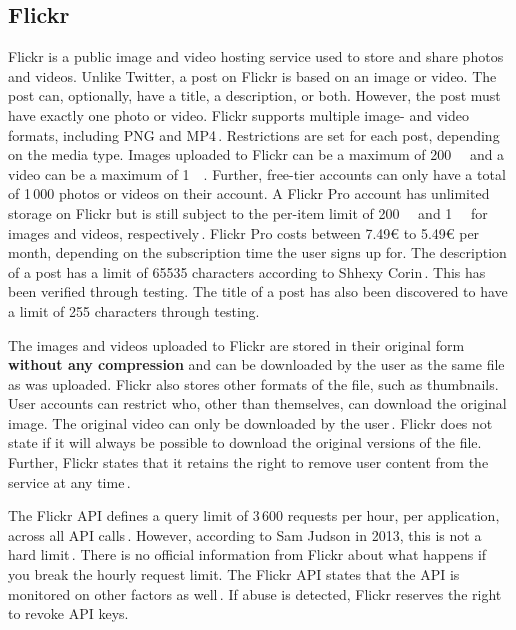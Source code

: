 \subsection{Flickr}
\label{subsec:ows_flickr}
Flickr is a public image and video hosting service used to store and share photos and videos. Unlike Twitter, a post on Flickr is based on an image or video. The post can, optionally, have a title, a description, or both. However, the post must have exactly one photo or video. Flickr supports multiple image- and video formats, including PNG and MP4\,\cite{FlickrUploadRequirements2022}. Restrictions are set for each post, depending on the media type. Images uploaded to Flickr can be a maximum of \SI{200}{\mega\byte} and a video can be a maximum of \SI{1}{\giga\byte}. Further, free-tier accounts can only have a total of 1\,000 photos or videos on their account. A Flickr Pro account has unlimited storage on Flickr but is still subject to the per-item limit of \SI{200}{\mega\byte} and \SI{1}{\giga\byte} for images and videos, respectively\,\cite{flickrinc.UpgradeEverythingYou}. Flickr Pro costs between 7.49€ to 5.49€ per month, depending on the subscription time the user signs up for. The description of a post has a limit of 65535 characters according to Shhexy Corin\,\cite{FlickrHelpForum2009}. This has been verified through testing. The title of a post has also been discovered to have a limit of 255 characters through testing.

The images and videos uploaded to Flickr are stored in their original form \textbf{without any compression} and can be downloaded by the user as the same file as was uploaded\cite{flickrinc.DownloadPermissions}. Flickr also stores other formats of the file, such as thumbnails. User accounts can restrict who, other than themselves, can download the original image. The original video can only be downloaded by the user\,\cite{flickrinc.DownloadPermissions}. Flickr does not state if it will always be possible to download the original versions of the file. Further, Flickr states that it retains the right to remove user content from the service at any time\,\cite{flickrinc.FlickrTermsConditions2020}.

The Flickr API defines a query limit of 3\,600 requests per hour, per application, across all API calls\,\cite{flickrinc.FlickrFlickrDeveloper}. However, according to Sam Judson in 2013, this is not a hard limit\,\cite{WhatAreAPI2013}. There is no official information from Flickr about what happens if you break the hourly request limit. The Flickr API states that the API is monitored on other factors as well\,\cite{flickrinc.FlickrFlickrDeveloper}. If abuse is detected, Flickr reserves the right to revoke API keys.